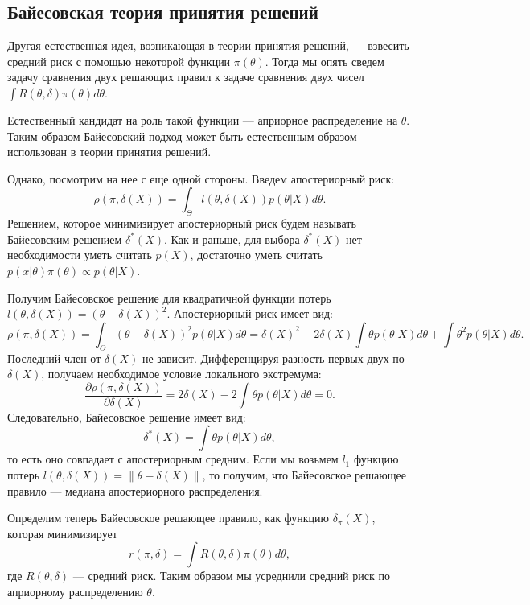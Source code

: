 \subsection{Байесовская теория принятия решений}

Другая естественная идея, возникающая в теории принятия решений,
--- взвесить средний риск с помощью некоторой функции $\pi(\theta)$.
Тогда мы опять сведем задачу сравнения двух решающих правил к задаче сравнения двух чисел $\int R(\theta, \delta) \pi(\theta) d\theta$.

Естественный кандидат на роль такой функции --- априорное распределение на $\theta$.
Таким образом Байесовский подход может быть естественным образом использован в теории принятия решений.

Однако, посмотрим на нее с еще одной стороны.
Введем апостериорный риск:
\[
\rho(\pi, \delta(X)) = \int_{\Theta} l(\theta, \delta(X)) p(\theta| X) d\theta.
\]
Решением, которое минимизирует апостериорный риск будем называть Байесовским решением $\delta^*(X)$.
Как и раньше, для выбора $\delta^*(X)$ нет необходимости уметь считать $p(X)$, достаточно уметь считать $p(x| \theta) \pi(\theta) \propto p(\theta | X)$.

\begin{example}
Получим Байесовское решение для квадратичной функции потерь $l(\theta, \delta(X)) = (\theta - \delta(X))^2$.
Апостериорный риск имеет вид:
\[
\rho(\pi, \delta(X)) = \int_{\Theta} (\theta - \delta(X))^2 p(\theta| X) d\theta = \delta(X)^2 - 2 \delta(X) \int \theta p(\theta | X) d\theta +
\int \theta^2 p(\theta | X) d \theta.
\]
Последний член от $\delta(X)$ не зависит.
Дифференцируя разность первых двух по $\delta(X)$, получаем необходимое условие локального экстремума:
\[
\frac{\partial\rho(\pi, \delta(X))}{\partial \delta(X)} = 2 \delta(X) - 2 \int \theta p(\theta | X) d\theta = 0.
\]
Следовательно, Байесовское решение имеет вид:
\[
\delta^*(X) = \int \theta p(\theta | X) d\theta,
\]
то есть оно совпадает с апостериорным средним.
Если мы возьмем $l_1$ функцию потерь $l(\theta, \delta(X)) = \| \theta - \delta(X) \|$, то получим, что Байесовское решающее правило --- медиана апостериорного распределения.

\end{example}

Определим теперь Байесовское решающее правило, как функцию $\delta_\pi(X)$, которая минимизирует
\[
r(\pi, \delta) = \int R(\theta, \delta) \pi(\theta) d\theta,
\]
где $R(\theta, \delta)$ --- средний риск.
Таким образом мы усреднили средний риск по априорному распределению $\theta$.

